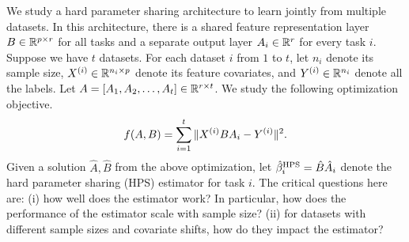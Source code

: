 We study a hard parameter sharing architecture to learn jointly from multiple datasets.
In this architecture, there is a shared feature representation layer $B\in\mathbb{R}^{p\times r}$ for all tasks and a separate output layer $A_i \in \mathbb{R}^r$ for every task $i$.
Suppose we have $t$ datasets.
For each dataset $i$ from $1$ to $t$, let $n_i$ denote its sample size, $X^{(i)} \in \mathbb{R}^{n_i \times p}$ denote its feature covariates, and $Y^{(i)} \in \mathbb{R}^{n_i}$ denote all the labels.
Let $A = [A_1, A_2, \dots, A_t] \in \mathbb{R}^{r \times t}$.
We study the following optimization objective.
\begin{align}\label{eq_mtl}
			f(A, B) = \sum_{i=1}^t \|X^{(i)} B A_i - Y^{(i)}\|^2.
\end{align}
Given a solution $\hat{A}, \hat{B}$ from the above optimization, let $\hat{\beta}_i^{\textup{HPS}} = \hat{B} \hat{A}_i$ denote the hard parameter sharing (HPS) estimator for task $i$.
The critical questions here are:
(i) how well does the estimator work? In particular, how does the performance of the estimator scale with sample size?
(ii) for datasets with different sample sizes and covariate shifts, how do they impact the estimator?



